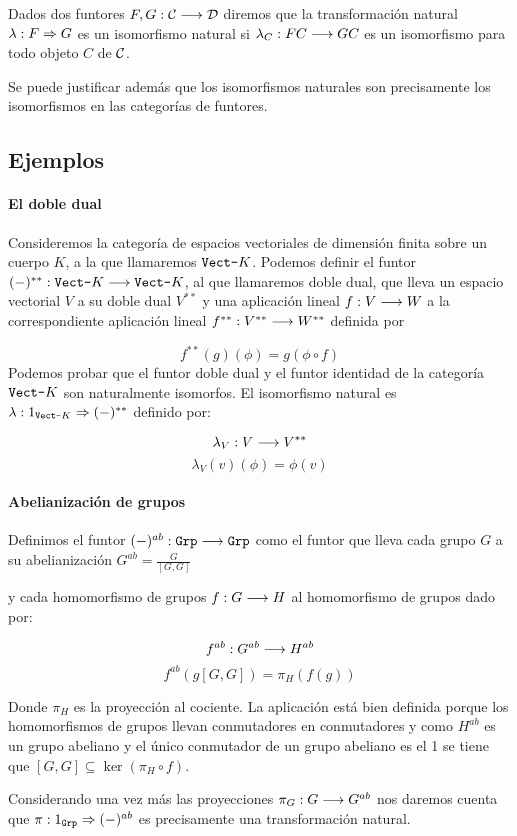 \begin{definition}
  Dados dos funtores $F, G : \mathcal{C}\longrightarrow \mathcal{D}$ diremos que la transformación
  natural $\lambda : F\Rightarrow G$ es un isomorfismo natural si
  $\lambda_C : FC\longrightarrow GC$ es un isomorfismo para todo objeto $C$
  de $\mathcal{C}$.
\end{definition}

Se puede justificar además que los isomorfismos naturales
son precisamente los isomorfismos en las categorías de funtores.

\subsection{Ejemplos}
\paragraph{El doble dual}
Consideremos la categoría de espacios vectoriales de dimensión
finita sobre un cuerpo $K$, a la que llamaremos $\texttt{Vect-}K$. Podemos
definir el funtor $(-)^{**}: \texttt{Vect-}K\longrightarrow \texttt{Vect-}K$, al que llamaremos
doble dual, que lleva un espacio vectorial $V$ a su doble dual
$V^{**}$ y una aplicación lineal
$f: V\longrightarrow W$ a la correspondiente aplicación
lineal
$f^{**} : V^{**}\longrightarrow W^{**}$ definida por

$$f^{**}(g)(\phi) = g(\phi\circ f)$$
Podemos probar que el funtor doble dual y el funtor identidad
de la categoría $\texttt{Vect-}K$ son naturalmente isomorfos. El isomorfismo
natural es $\lambda : 1_{\texttt{Vect-}K}\Rightarrow (-)^{**}$ definido por:

$$\lambda_V : V\longrightarrow V^{**}$$
$$\lambda_V(v)(\phi) = \phi(v)$$

\paragraph{Abelianización de grupos}
Definimos el funtor $(-)^{ab} : \texttt{Grp}\longrightarrow \texttt{Grp}$
como el funtor que lleva
cada grupo $G$ a su abelianización
$G^{ab} =\frac{G}{[G, G]}$

y cada homomorfismo de grupos $f : G\longrightarrow H$ al homomorfismo
de grupos dado por:

$$f^{ab} : G^{ab}\longrightarrow H^{ab}$$
$$f^{ab}(g[G, G]) = \pi_H (f(g))$$

Donde $\pi_H$ es la proyección al cociente.
La aplicación está bien definida porque los homomorfismos
de grupos llevan conmutadores en conmutadores y como
$H^{ab}$ es un grupo abeliano y el único conmutador de un
grupo abeliano es el 1 se tiene que
$[G, G] \subseteq \ker (\pi_H \circ f)$.


Considerando una vez más las proyecciones
$\pi_G : G\longrightarrow G^{ab}$ nos daremos cuenta
que $\pi : 1_{\texttt{Grp}}\Rightarrow (-)^{ab}$ es precisamente
una transformación natural.
